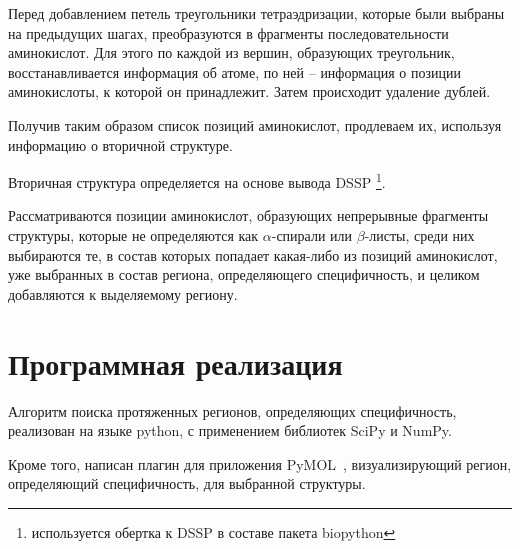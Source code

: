 Перед добавлением петель треугольники тетраэдризации, которые были выбраны на предыдущих шагах, преобразуются в фрагменты последовательности аминокислот. Для этого по каждой из вершин, образующих треугольник, восстанавливается информация об атоме, по ней -- информация о позиции аминокислоты, к которой он принадлежит. Затем происходит удаление дублей.

Получив таким образом список позиций аминокислот, продлеваем их, используя информацию о вторичной структуре.

Вторичная структура определяется на основе вывода DSSP \footnote{используется обертка к DSSP в составе пакета biopython}.

Рассматриваются позиции аминокислот, образующих непрерывные фрагменты структуры, которые не определяются как $\alpha$-спирали или $\beta$-листы, среди них выбираются те, в состав которых попадает какая-либо из позиций аминокислот, уже выбранных в состав региона, определяющего специфичность, и целиком добавляются к выделяемому региону.












\section{Программная реализация}

Алгоритм поиска протяженных регионов, определяющих специфичность, реализован на языке python, с применением библиотек SciPy\cite{scipy} и NumPy\cite{numpy}.

Кроме того, написан плагин для приложения PyMOL~\cite{pymol}, визуализирующий регион, определяющий специфичность, для выбранной структуры.
